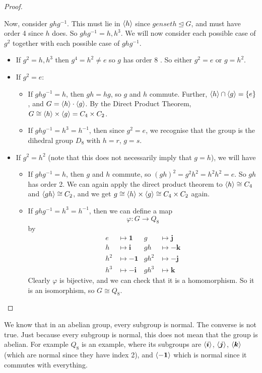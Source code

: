\documentclass{article}
\begin{document}
\begin{proof}
\begin{itemize}
		      Now, consider $ghg^{-1}$. This must lie in $\langle h \rangle$ since $genset{h} \trianglelefteq G$, and must have order 4 since $h$ does. So $ghg^{-1} = h, h^3$. We will now consider each possible case of $g^2$ together with each possible case of $ghg^{-1}$.
		      \begin{itemize}
			      \item If $g^2 = h, h^3$ then $g^4 = h^2 \neq e$ so $g$ has order 8 \contradiction. So either $g^2 = e$ or $g=h^2$.
			      \item If $g^2 = e$:
			            \begin{itemize}
				            \item If $ghg^{-1} = h$, then $gh = hg$, so $g$ and $h$ commute. Further, $\langle h \rangle \cap \langle g \rangle = \{ e \}$, and $G = \langle h \rangle \cdot \langle g \rangle$. By the Direct Product Theorem, $G \cong \langle h \rangle \times \langle g \rangle = C_4 \times C_2$.
				            \item If $ghg^{-1} = h^3 = h^{-1}$, then since $g^2 = e$, we recognise that the group is the dihedral group $D_8$ with $h=r$, $g=s$.
			            \end{itemize}
			      \item If $g^2 = h^2$ (note that this does not necessarily imply that $g=h$), we will have
			            \begin{itemize}
				            \item If $ghg^{-1} = h$, then $g$ and $h$ commute, so $(gh)^2 = g^2h^2 = h^2h^2 = e$. So $gh$ has order 2. We can again apply the direct product theorem to $\langle h \rangle \cong C_4$ and $\langle gh \rangle \cong C_2$, and we get $g \cong \langle h \rangle \times \langle g \rangle \cong C_4 \times C_2$ again.
				            \item If $ghg^{-1} = h^3 = h^{-1}$, then we can define a map
				                  \[ \varphi \colon G \to Q_8 \]
				                  by
				                  \begin{align*}
					                  e   & \mapsto \bm 1  & g    & \mapsto \bm j  \\
					                  h   & \mapsto \bm i  & gh   & \mapsto -\bm k \\
					                  h^2 & \mapsto -\bm 1 & gh^2 & \mapsto -\bm j \\
					                  h^3 & \mapsto -\bm i & gh^3 & \mapsto \bm k
				                  \end{align*}
				                  Clearly $\varphi$ is bijective, and we can check that it is a homomorphism. So it is an isomorphism, so $G \cong Q_8$.
			            \end{itemize}
		      \end{itemize}
	\end{itemize}
\end{proof}
\begin{remark}
	We know that in an abelian group, every subgroup is normal. The converse is not true. Just because every subgroup is normal, this does not mean that the group is abelian. For example $Q_8$ is an example, where its subgroups are $\langle \bm i \rangle$, $\langle \bm j \rangle$, $\langle \bm k \rangle$ (which are normal since they have index 2), and $\langle -\bm 1 \rangle$ which is normal since it commutes with everything.
\end{remark}
\end{document}
